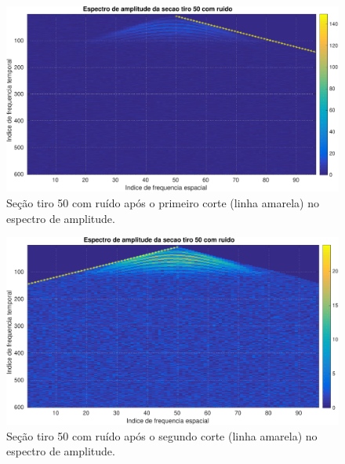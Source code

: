 \begin{landscape}
\begin{figure}[H]
\centering
\includegraphics[totalheight=14cm]{figuras/cap2/espc_tiro50_c1.pdf}
\caption{Seção tiro 50 com ruído após o primeiro corte (linha amarela) no espectro de amplitude.}
\label{fig:espc_tiro50_c1}
\end{figure}
\end{landscape}

\begin{landscape}
\begin{figure}[H]
\centering
\includegraphics[totalheight=14cm]{figuras/cap2/espc_tiro50_c2.pdf}
\caption{Seção tiro 50 com ruído após o segundo corte (linha amarela) no espectro de amplitude.}
\label{fig:espc_tiro50_c2}
\end{figure}
\end{landscape}

